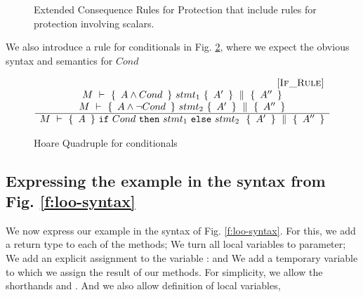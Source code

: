 \begin{figure}[htb]
\caption{Extended Consequence Rules for Protection that include rules for protection involving scalars.}
\label{f:protection:conseq:ext}
\end{figure}

We also introduce a rule for conditionals in Fig. \ref{f:if}, {where we expect the obvious syntax and semantics for $Cond$}

\begin{figure}[htb]
$$
\inferruleSD{\hspace{2.5cm} [\sc{If\_Rule}]}
	{
	 \begin{array}{c}
	  \hprovesN {M}   
		{\  A \wedge Cond \  }
		{\    stmt_1   \ }
 		{\ A' \ }
		{\ A'' \ }
	\\
	    \hprovesN {M}   
		{\  A \wedge \neg Cond \  }
		{\    stmt_2   \ }
 		{\ A' \ }
		{\ A'' \ }	
	\end{array}
	}	 
 	{  
	
	\hprovesN {M}   
		{\  A \  }
		{\  \prg{if}\ Cond\ \prg{then}\ stmt_1\ \prg{else}\ stmt_2 \ \ }
		{\ A' \ }
		{\ A'' \ }
}
$$
\caption{Hoare Quadruple  for conditionals}
\label{f:if}
\end{figure}


\subsection{Expressing the  example in the syntax from Fig. \ref{f:loo-syntax}}
\label{s:app:syntax:transform}

{
We now express our example in the syntax of Fig. \ref{f:loo-syntax}. 
For this, we  add a return type to each of the methods; 
We turn all local variables to parameter; We add an explicit assignment to the variable : and We   add a temporary variable  to which we assign the result of our  methods.
For simplicity, we allow %
the shorthands \prg{+=} and \prg{-=}.
And we also allow definition of local variables, \eg  {} }

